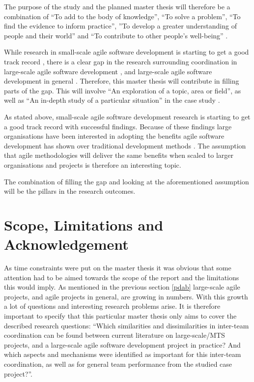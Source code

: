 The purpose of the study and the planned master thesis will therefore be a combination of ``To add to the body of knowledge'', ``To solve a problem'', ``To find the evidence to inform practice'', ''To develop a greater understanding of people and their world'' and ``To contribute to other people's well-being'' \cite{Oates2006}.

While research in small-scale agile software development is starting to get a good track record \cite{Paasivaara2012, Haaster2014}, there is a clear gap in the research surrounding coordination in large-scale agile software development \cite{Pikkarainen2008, Paasivaara2012, Dingsoyr2013b}, and large-scale agile software development in general \cite{Freudenberg2010, Haaster2014}. Therefore, this master thesis will contribute in filling parts of the gap. This will involve ``An exploration of a topic, area or field'', as well as ``An in-depth study of a particular situation'' in the case study \cite{Oates2006}.

As stated above, small-scale agile software development research is starting to get a good track record with successful findings. Because of these findings large organisations have been interested in adopting the benefits agile software development has shown over traditional development methods \cite{Com2013, Vlietland2015, Agerfalk2006, Paasivaara2012}. The assumption that agile methodologies will deliver the same benefits when scaled to larger organisations and projects is therefore an interesting topic.

The combination of filling the gap and looking at the aforementioned assumption will be the pillars in the research outcomes.

\section{Scope, Limitations and Acknowledgement}

As time constraints were put on the master thesis it was obvious that some attention had to be aimed towards the scope of the report and the limitations this would imply. As mentioned in the previous section \ref{pdab} large-scale agile projects, and agile projects in general, are growing in numbers. With this growth a lot of questions and interesting research problems arise. It is therefore important to specify that this particular master thesis only aims to cover the described research questions: ``Which similarities and dissimilarities in inter-team coordination can be found between current literature on large-scale/MTS projects, and a large-scale agile software development project in practice? And which aspects and mechanisms were identified as important for this inter-team coordination, as well as for general team performance from the studied case project?''.

